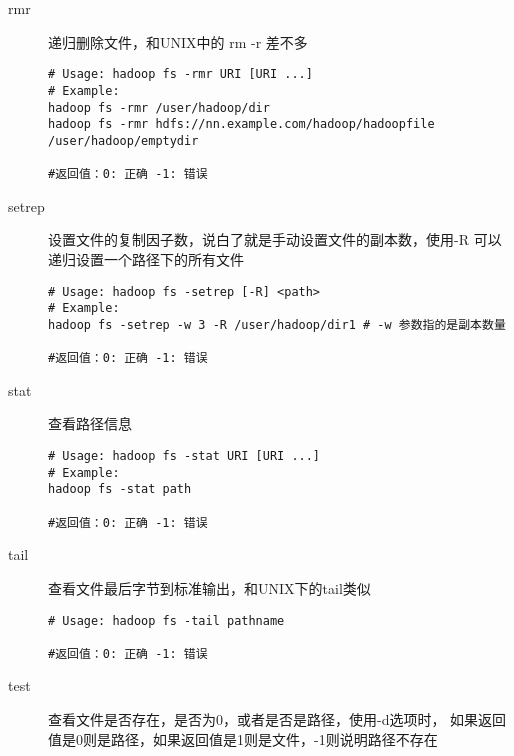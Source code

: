 \documentclass{article}
\begin{document}
\begin{description}
\item[rmr] 递归删除文件，和UNIX中的 rm -r 差不多

\begin{verbatim}
# Usage: hadoop fs -rmr URI [URI ...]
# Example:
hadoop fs -rmr /user/hadoop/dir
hadoop fs -rmr hdfs://nn.example.com/hadoop/hadoopfile /user/hadoop/emptydir

#返回值：0: 正确 -1: 错误
\end{verbatim}

\item[setrep] 设置文件的复制因子数，说白了就是手动设置文件的副本数，使用-R
可以递归设置一个路径下的所有文件

\begin{verbatim}
# Usage: hadoop fs -setrep [-R] <path>
# Example:
hadoop fs -setrep -w 3 -R /user/hadoop/dir1 # -w 参数指的是副本数量

#返回值：0: 正确 -1: 错误
\end{verbatim}

\item[stat] 查看路径信息

\begin{verbatim}
# Usage: hadoop fs -stat URI [URI ...]
# Example:
hadoop fs -stat path

#返回值：0: 正确 -1: 错误
\end{verbatim}

\item[tail] 查看文件最后字节到标准输出，和UNIX下的tail类似

\begin{verbatim}
# Usage: hadoop fs -tail pathname

#返回值：0: 正确 -1: 错误
\end{verbatim}

\item[test] 查看文件是否存在，是否为0，或者是否是路径，使用-d选项时，
如果返回值是0则是路径，如果返回值是1则是文件，-1则说明路径不存在


\end{description}
\end{document}
